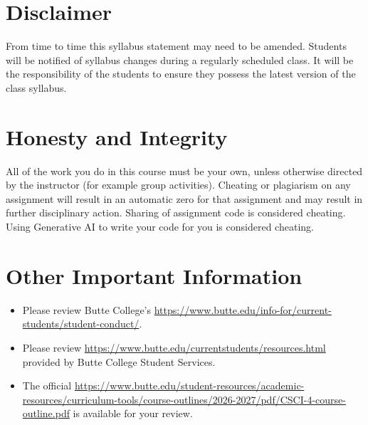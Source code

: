 \documentclass[12pt]{article}
\begin{document}
	\section*{Disclaimer}
		From time to time this syllabus statement may need to be amended. Students will be notified of syllabus changes during a regularly scheduled class. It will be the responsibility of the students to ensure they possess the latest version of the class syllabus.

	\section*{Honesty and Integrity}
		All of the work you do in this course must be your own, unless otherwise directed by the instructor (for example group activities). Cheating or plagiarism on any assignment will result in an automatic zero for that assignment and may result in further disciplinary action. Sharing of assignment code is considered cheating. Using Generative AI to write your code for you is considered cheating.

	\section*{Other Important Information}
		\begin{itemize}
			\item Please review Butte College's \href{Student Academic Policies and Procedures}{https://www.butte.edu/info-for/current-students/student-conduct/}.
			\item Please review \href{Campus Resources}{https://www.butte.edu/currentstudents/resources.html} provided by Butte College Student Services.
			\item The official \href{Course Outline of Record}{https://www.butte.edu/student-resources/academic-resources/curriculum-tools/course-outlines/2026-2027/pdf/CSCI-4-course-outline.pdf} is available for your review.
		\end{itemize}
	
\end{document}
